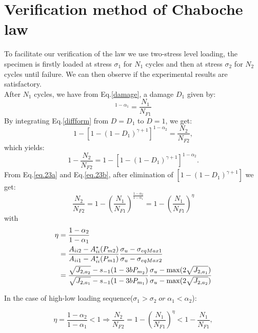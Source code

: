 \clearpage
\section{Verification method of Chaboche law}

To facilitate our verification of the law we use two-stress level loading, the specimen is firstly loaded at stress $\sigma_1$ for $N_1$ cycles and then at stress $\sigma_2$ for $N_2$ cycles until failure. We can then observe if the experimental results are satisfactory.\\
After $N_1$ cycles, we have from Eq.\eqref{damage}, a damage $D_1$ given by:
\begin{equation}
[1-(1-D_1)^{\gamma+1}]^{1-\alpha_1}=\frac{N_1}{N_{F1}}
\label{eq.23a}
\end{equation}
By integrating Eq.\eqref{diffform} from $D=D_1$ to $D=1$, we get:
\begin{equation}
1-[1-(1-D_1)^{\gamma+1}]^{1-\alpha_2}=\frac{N_2}{N_{F2}},
\end{equation}
which yields:
\begin{equation}1-\frac{N_2}{N_{F2}}=1-[1-(1-D_1)^{\gamma+1}]^{1-\alpha_2}.
\label{eq.23b}
\end{equation}
From Eq.\eqref{eq.23a} and Eq.\eqref{eq.23b}, after elimination of $[1-(1-D_1)^{\gamma+1}]$ we get:
\begin{equation} \frac{N_2}{N_{F2}}=1-(\frac{N_1}{N_{F1}})^\frac{1-\alpha_2}{1-\alpha_1}=1-(\frac{N_1}{N_{F1}})^\eta\end{equation}
with
\begin{equation}
		\begin{split}
			\eta&=\frac{1-\alpha_2}{1-\alpha_1}
			\\&=\frac{A_{\uppercase\expandafter{\romannumeral2 2}} - A_{\uppercase\expandafter{\romannumeral2}}^\ast(P_{m2})}{A_{\uppercase\expandafter{\romannumeral2 1}} - A_{\uppercase\expandafter{\romannumeral2}}^\ast(P_{m1})}\frac{ \sigma_{u} - \sigma_{eqMax1}}{ \sigma_{u} - \sigma_{eqMax2}}
			\\&=\frac{\sqrt{J_{2,a_2}} - s_{-1}(1-3bP_{m_2})}{\sqrt{J_{2,a_1}} - s_{-1}(1-3bP_{m_1})}\frac{ \sigma_{u} - \max(2\sqrt{J_{2,a_1}})}{  \sigma_{u} - \max(2\sqrt{J_{2,a_2}})}
	\end{split}
\label{eq.etachaboche}
\end{equation}

In the case of high-low loading sequence($\sigma_1>\sigma_2 \; or \; \alpha_1<\alpha_2$):

$$\eta=\frac{1-\alpha_2}{1-\alpha_1}<1\Rightarrow \frac{N_2}{N_{F2}}=1-(\frac{N_1}{N_{F1}})^\eta<1-\frac{N_1}{N_{F1}},$$

